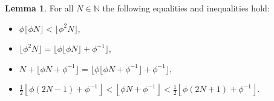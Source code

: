 \documentclass[]{interact}
\newcommand{\bbN}{\mathbb{N}}
\theoremstyle{definition}
\newtheorem{lem}[thm]{Lemma}
\numberwithin{table}{section} %
\numberwithin{figure}{section}
\begin{document}
\begin{lem} \label{lem:floor}
For all $N \in \bbN$ the following equalities and inequalities hold:
    \begin{itemize}
        \item [(i)] $\phi \lfloor \phi N\rfloor < \lfloor \phi^2 N\rfloor$,

        \item [(ii)] $\lfloor \phi^2 N \rfloor = \lfloor \phi \lfloor \phi N\rfloor + \phi^{-1}\rfloor$,

        \item [(iii)] $N + \lfloor \phi N + \phi^{-1}\rfloor = \lfloor \phi \lfloor \phi N + \phi^{-1}\rfloor + \phi^{-1}\rfloor$,

        \item [(iv)] $\frac12 \left\lfloor \phi (2N-1) + \phi^{-1} \right\rfloor < \left\lfloor \phi N + \phi^{-1} \right\rfloor < \frac12 \left\lfloor \phi (2N+1) + \phi^{-1} \right\rfloor$.
    \end{itemize}
\end{lem}
\end{document}
